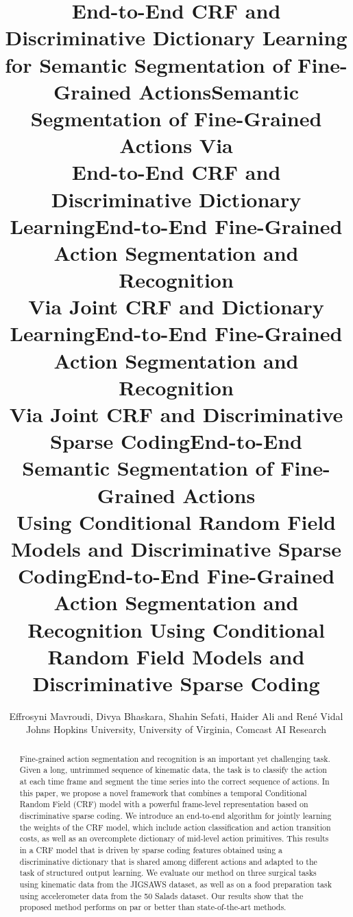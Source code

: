 \documentclass[10pt,twocolumn,letterpaper]{article}
\begin{document}
\title{End-to-End CRF and Discriminative Dictionary Learning \\ for Semantic Segmentation of Fine-Grained Actions}
\title{Semantic Segmentation of Fine-Grained Actions Via \\ End-to-End CRF and Discriminative Dictionary Learning}
\title{End-to-End Fine-Grained Action Segmentation and Recognition \\Via Joint CRF and Dictionary Learning}
\title{End-to-End Fine-Grained Action Segmentation and Recognition \\Via Joint CRF and Discriminative Sparse Coding}
\title{End-to-End Semantic Segmentation of Fine-Grained Actions \\Using Conditional Random Field Models and Discriminative Sparse Coding}
\title{End-to-End Fine-Grained Action Segmentation and Recognition Using Conditional Random Field Models and Discriminative Sparse Coding}

\author{Effrosyni Mavroudi, Divya Bhaskara, Shahin Sefati, Haider Ali and Ren\'e Vidal\\
Johns Hopkins University,
University of Virginia,
Comcast AI Research\\
}

\maketitle



\begin{abstract}
Fine-grained action segmentation and recognition is an important yet challenging task. Given a long, untrimmed sequence of kinematic data, the task is to classify the action at each time frame and segment the time series into the correct sequence of actions. In this paper, we propose a novel framework that combines a temporal Conditional Random Field (CRF) model with a powerful frame-level representation based on discriminative sparse coding. We introduce an end-to-end algorithm for jointly learning the weights of the CRF model, which include action classification and action transition costs, as well as an overcomplete dictionary of mid-level action primitives. This results in a CRF model that is driven by sparse coding features obtained using a discriminative dictionary that is shared among different actions and adapted to the task of structured output learning. We evaluate our method on three surgical tasks using kinematic data from the JIGSAWS dataset, as well as on a food preparation task using accelerometer data from the 50 Salads dataset. Our results show that the proposed method performs on par or better than state-of-the-art methods.
\end{abstract}
\end{document}
